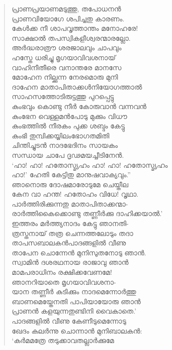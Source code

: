 \begin{verse}
പ്രാണപ്രയാണമടുത്തു, തപോധനന്‍\\
പ്രാണവിയോഗേ ശപിച്ചതു കാരണം.\\
കേള്‍ക്ക നീ ശാപവൃത്താന്തം മനോഹരേ!\\
സാക്ഷാല്‍ തപസ്വികളീശ്വരന്മാരല്ലോ.\\
അര്‍ദ്ധരാത്രൗ ശരജാലവും ചാപവും\\
ഹസ്തേ ധരിച്ചു മൃഗയാവിവശനായ്\\
വാഹിനീതീരെ വനാന്തരേ മാനസേ\\
മോഹേന നില്ക്കുന്ന നേരമൊരു മുനി\\
ദാഹേന മാതാപിതാക്കള്‍നിയോഗത്താല്‍\\
സാഹസത്തോടിരുട്ടത്തു പുറപ്പെട്ടു\\
കുംഭവും കൊണ്ടു നീര്‍ കോരുവാന്‍ വന്നവന്‍\\
കുംഭേന വെള്ളമന്‍പോടു മുക്കും വിധൗ\\
കുംഭത്തില്‍ നീരകം പുക്ക ശബ്ദം കേട്ടു\\
കുംഭി തുമ്പിക്കയ്യിലംഭോഗതമിതി\\
ചിന്തിച്ചുടന്‍ നാദഭേദിനം സായകം\\
സന്ധായ ചാപേ ദൃഢമയച്ചീടിനേന്‍.\\
‘ഹാ! ഹാ! ഹതോസ്മ്യഹം ഹാ! ഹാ! \hbox{ഹതോസ്മ്യഹം}\\
ഹാ!’ ഹേതി കേട്ടിതു മാനുഷവാക്യവും.”\\
ഞാനൊരു ദോഷമാരോടുമേ ചെയ്തീല\\
കേന വാ ഹന്ത! ഹതോഹം വിധേ! വൃഥാ.\\
പാര്‍ത്തിരിക്കുന്നതു മാതാപിതാക്കന്മാ-\\
രാര്‍ത്തികൈക്കൊണ്ടു തണ്ണീര്‍ക്കു ദാഹിക്കയാല്‍.’\\
ഇത്തരം മര്‍ത്ത്യനാദം കേട്ടു ഞാനതി-\\
ത്രസ്തനായ് തത്ര ചെന്നത്തലോടും തദാ\\
താപസബാലകന്‍പാദങ്ങളില്‍ വീണു\\
താപേന ചൊന്നേന്‍ മുനിസുതനോടു ഞാന്‍.\\
സ്വാമിന്‍ ദശരഥനായ രാജാവു ഞാന്‍\\
മാമപരാധിനം രക്ഷിക്കവേണമേ!\\
ഞാനറിയാതെ മൃഗയാവിവശനാ-\\
യാന തണ്ണീര്‍ കുടിക്കും നാദമെന്നോര്‍ത്തു\\
ബാണമെയ്തേനതി പാപിയായോരു ഞാന്‍\\
പ്രാണന്‍ കളയുന്നതുണ്ടിനി വൈകാതെ.’\\
പാദങ്ങളില്‍ വീണു കേണീടുമെന്നോടു\\
ഖേദം കലര്‍ന്നു ചൊന്നാന്‍ മുനിബാലകന്‍:\\
‘കര്‍മമത്രേ തടുക്കാവതല്ലാര്‍ക്കുമേ\\

\end{verse}

